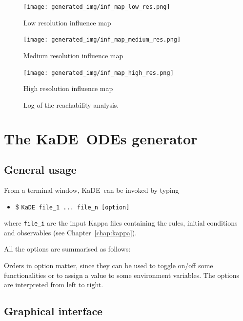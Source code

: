 \documentclass[11pt]{book}
\def\KaDE{\textsf{KaDE}}
\def\ttt#1{\texttt{#1}}
\def\ITE#1{\begin{itemize}#1\end{itemize}}
\begin{document}
\begin{figure}[htbp]
\begin{center}
\texttt{[image: generated\_img/inf\_map\_low\_res.png]}
\caption{Low resolution influence map}
\label{fig:low-res}
\end{center}
\end{figure}
\begin{figure}[htbp]
\begin{center}
\texttt{[image: generated\_img/inf\_map\_medium\_res.png]}
\caption{Medium resolution influence map}
\label{fig:medium-res}
\end{center}
\end{figure}
\begin{figure}[htbp]
\begin{center}
\texttt{[image: generated\_img/inf\_map\_high\_res.png]}
\caption{High resolution influence map}
\label{fig:high-res}
\end{center}
\end{figure}

\begin{figure}[t]

\caption{Log of the reachability analysis.}
\label{fig:reachability_influence}
\end{figure}

\chapter{The \KaDE~ODEs generator}

\section{General usage}

From a terminal window, \KaDE~can be invoked by typing
\ITE{
\item[\$] \ttt{KaDE file\_1 ... file\_n  [option]}
}
where \ttt{file\_i} are the input Kappa files containing the rules, initial conditions and observables (see Chapter~\ref{chap:kappa}).

All the options are summarised as follows:


Orders in option matter, since they can be used to toggle on/off some functionalities or to assign a value to some environment variables.
The options are interpreted from left to right.

\section{Graphical interface}
\end{document}
